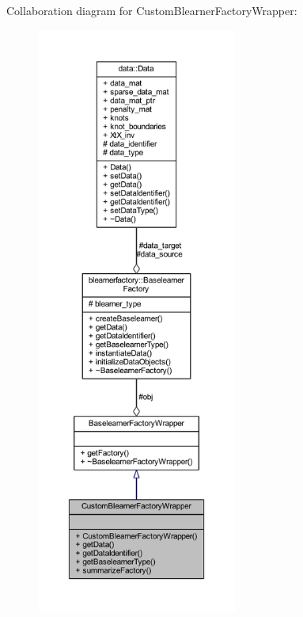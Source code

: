 Collaboration diagram for Custom\+Blearner\+Factory\+Wrapper\+:
\nopagebreak
\begin{figure}[H]
\begin{center}
\leavevmode
\includegraphics[height=550pt]{class_custom_blearner_factory_wrapper__coll__graph}
\end{center}
\end{figure}
